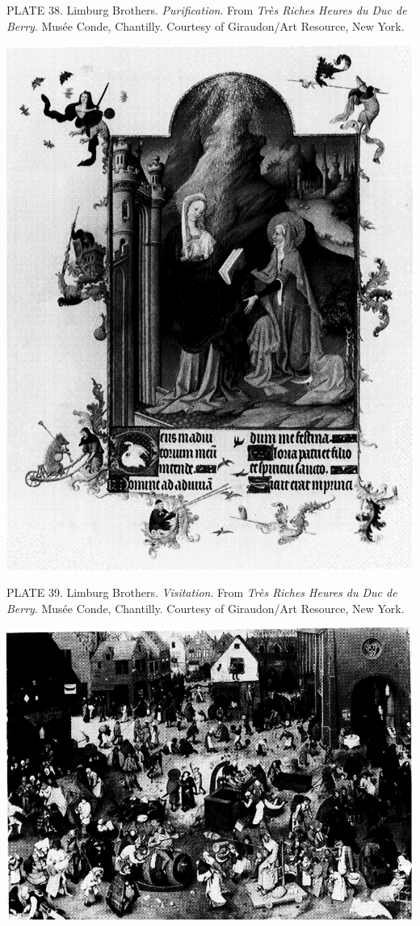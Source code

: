 PLATE 38. Limburg Brothers. \emph{Purification}. From \emph{Très Riches
Heures du Duc de Berry}. Musée Conde, Chantilly. Courtesy of
Giraudon/Art Resource, New York.

\protect\hypertarget{20_ILLUSTRATIONS_FOLLOW_PAGE.xhtmlux5cux23id_34}{}{}\includegraphics{include/html/images/354_1.png}

PLATE 39. Limburg Brothers. \emph{Visitation}. From \emph{Très Riches
Heures du Duc de Berry}. Musée Conde, Chantilly. Courtesy of
Giraudon/Art Resource, New York.

\protect\hypertarget{20_ILLUSTRATIONS_FOLLOW_PAGE.xhtmlux5cux23id_35}{}{}\includegraphics{include/html/images/355_1.png}

